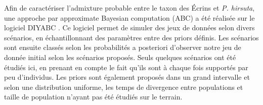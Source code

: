 Afin de caractériser l'admixture probable entre le taxon des Écrins et \textit{P. hirsuta}, une approche par approximate Bayesian computation (ABC) a été réalisée sur le logiciel DIYABC \cite{Cornuet2014}. 
Ce logiciel permet de simuler des jeux de données selon divers scénarios, en échantillonnant des paramètres entre des priors définis. 
Les scénarios sont ensuite classés selon les probabilités a posteriori d'observer notre jeu de donnée initial selon les scénarios proposés. 
Seuls quelques scénarios ont été étudiés ici, en prenant en compte le fait qu'ils sont à chaque fois supportés par peu d'individus. 
Les priors sont également proposés dans un grand intervalle et selon une distribution uniforme, les temps de divergence entre populations et taille de population n'ayant pas été étudiés sur le terrain.
